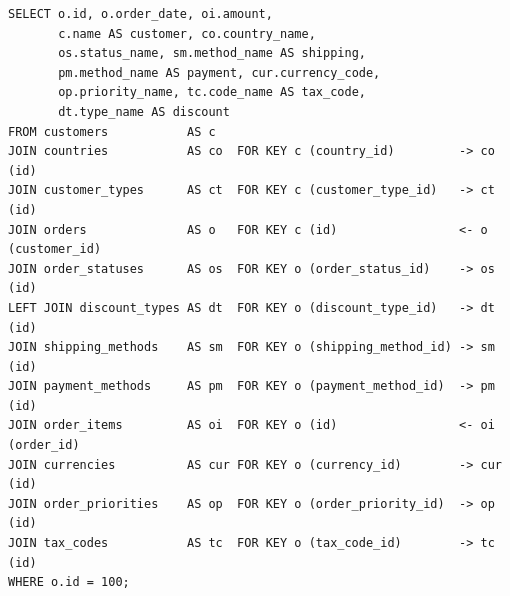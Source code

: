 \documentclass[12pt]{article}
\newcommand{\FanoutCheckHeight}[3]{%
  \ifdim\dimexpr\ht#1+\dp#1\relax>#2\relax
    \PackageError{fanout-layout}{#3 exceeds its vertical allocation}%
      {Adjust the terminal line spacing or the box position.}%
  \fi
}
\begin{document}
\newsavebox{\canonicalStageTwo}
\begin{lrbox}{\canonicalStageTwo}\begin{minipage}{344mm}
\begin{NoHyper}
\begin{lstlisting}[style=complex-sql]
SELECT o.id, o.order_date, oi.amount,
       c.name AS customer, co.country_name,
       os.status_name, sm.method_name AS shipping,
       pm.method_name AS payment, cur.currency_code,
       op.priority_name, tc.code_name AS tax_code,
       dt.type_name AS discount
FROM customers           AS c
JOIN countries           AS co  FOR KEY c (country_id)         -> co (id)
JOIN customer_types      AS ct  FOR KEY c (customer_type_id)   -> ct (id)
JOIN orders              AS o   FOR KEY c (id)                 <- o (customer_id)
JOIN order_statuses      AS os  FOR KEY o (order_status_id)    -> os (id)
LEFT JOIN discount_types AS dt  FOR KEY o (discount_type_id)   -> dt (id)
JOIN shipping_methods    AS sm  FOR KEY o (shipping_method_id) -> sm (id)
JOIN payment_methods     AS pm  FOR KEY o (payment_method_id)  -> pm (id)
JOIN order_items         AS oi  FOR KEY o (id)                 <- oi (order_id)
JOIN currencies          AS cur FOR KEY o (currency_id)        -> cur (id)
JOIN order_priorities    AS op  FOR KEY o (order_priority_id)  -> op (id)
JOIN tax_codes           AS tc  FOR KEY o (tax_code_id)        -> tc (id)
WHERE o.id = 100;
\end{lstlisting}
\end{NoHyper}
\end{minipage}\end{lrbox}
\FanoutCheckHeight{\canonicalStageTwo}{122mm}{Canonical-form state 2}
\end{document}
